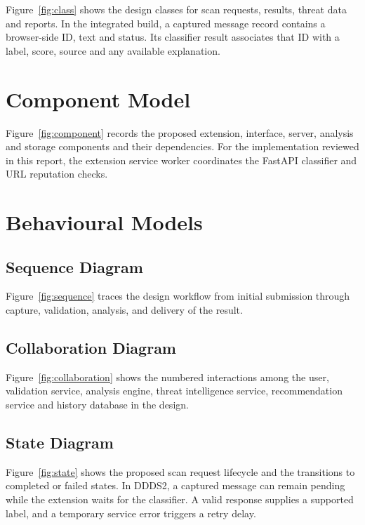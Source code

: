 \documentclass[12pt,letterpaper,twoside,openany]{book}
\begin{document}
Figure~\ref{fig:class} shows the design classes for scan requests, results, threat data and reports. In the integrated build, a captured message record contains a browser-side ID, text and status. Its classifier result associates that ID with a label, score, source and any available explanation. \cite{project,integration}

\section{Component Model}

Figure~\ref{fig:component} records the proposed extension, interface, server, analysis and storage components and their dependencies. For the implementation reviewed in this report, the extension service worker coordinates the FastAPI classifier and URL reputation checks. \cite{project,integration}

\section{Behavioural Models}

\subsection{Sequence Diagram}

Figure~\ref{fig:sequence} traces the design workflow from initial submission through capture, validation, analysis, and delivery of the result. \cite{project}

\subsection{Collaboration Diagram}

Figure~\ref{fig:collaboration} shows the numbered interactions among the user, validation service, analysis engine, threat intelligence service, recommendation service and history database in the design. \cite{project}

\subsection{State Diagram}

Figure~\ref{fig:state} shows the proposed scan request lifecycle and the transitions to completed or failed states. In DDDS2, a captured message can remain pending while the extension waits for the classifier. A valid response supplies a supported label, and a temporary service error triggers a retry delay. \cite{project,integration}
\end{document}
